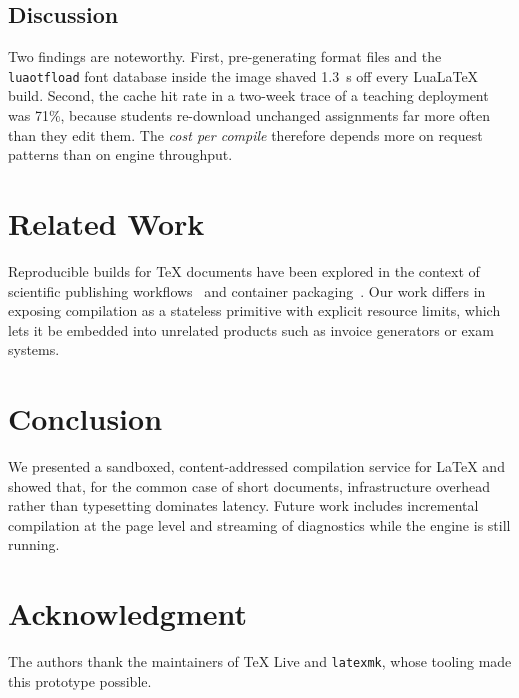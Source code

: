 \documentclass[conference]{IEEEtran}
\begin{document}
\subsection{Discussion}
Two findings are noteworthy. First, pre-generating format files and the
\texttt{luaotfload} font database inside the image shaved 1.3~s off every
Lua\LaTeX{} build. Second, the cache hit rate in a two-week trace of a
teaching deployment was 71\%, because students re-download unchanged
assignments far more often than they edit them. The \emph{cost per compile}
therefore depends more on request patterns than on engine throughput.

\section{Related Work}
Reproducible builds for \TeX{} documents have been explored in the context of
scientific publishing workflows~\cite{overleaf2023} and container
packaging~\cite{nist2017container}. Our work differs in exposing compilation
as a stateless primitive with explicit resource limits, which lets it be
embedded into unrelated products such as invoice generators or exam systems.

\section{Conclusion}
We presented a sandboxed, content-addressed compilation service for \LaTeX{}
and showed that, for the common case of short documents, infrastructure
overhead rather than typesetting dominates latency. Future work includes
incremental compilation at the page level and streaming of diagnostics while
the engine is still running.

\section*{Acknowledgment}
The authors thank the maintainers of \TeX{} Live and \texttt{latexmk}, whose
tooling made this prototype possible.



\end{document}
